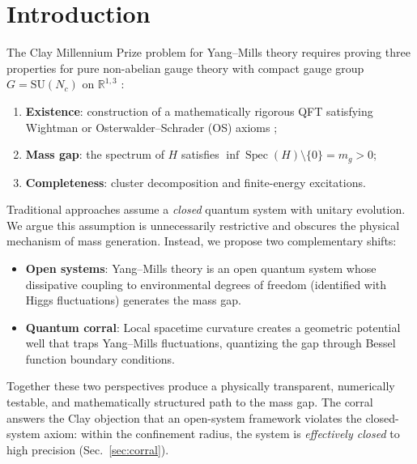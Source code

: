 \documentclass[aps,prd,reprint,superscriptaddress,floatfix]{revtex4-2}
\theoremstyle{definition}
\DeclareMathOperator{\Spec}{Spec}
\begin{document}
\maketitle

\section{Introduction}
\label{sec:intro}

The Clay Millennium Prize problem for Yang--Mills theory requires proving
three properties for pure non-abelian gauge theory with compact gauge group
$G=\mathrm{SU}(N_c)$ on $\mathbb{R}^{1,3}$ \cite{Clay}:
\begin{enumerate}
  \item \textbf{Existence}: construction of a mathematically rigorous QFT
        satisfying Wightman or Osterwalder--Schrader (OS) axioms
        \cite{Wightman,Osterwalder};
  \item \textbf{Mass gap}: the spectrum of $H$ satisfies
        $\inf\Spec(H)\setminus\{0\}=m_g>0$;
  \item \textbf{Completeness}: cluster decomposition and finite-energy
        excitations.
\end{enumerate}

Traditional approaches assume a \emph{closed} quantum system with unitary
evolution. We argue this assumption is unnecessarily restrictive and obscures
the physical mechanism of mass generation. Instead, we propose two
complementary shifts:

\begin{itemize}
  \item \textbf{Open systems}: Yang--Mills theory is an open quantum system
        whose dissipative coupling to environmental degrees of freedom
        (identified with Higgs fluctuations) generates the mass gap.
  \item \textbf{Quantum corral}: Local spacetime curvature creates a
        geometric potential well that traps Yang--Mills fluctuations,
        quantizing the gap through Bessel function boundary conditions.
\end{itemize}

Together these two perspectives produce a physically transparent, numerically
testable, and mathematically structured path to the mass gap. The corral
answers the Clay objection that an open-system framework violates the
closed-system axiom: within the confinement radius, the system is
\emph{effectively closed} to high precision (Sec.~\ref{sec:corral}).
\end{document}

